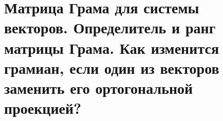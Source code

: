 \section{
    Матрица Грама для системы векторов. Определитель и ранг матрицы Грама. Как изменится грамиан, если один из векторов заменить его ортогональной проекцией?
}




